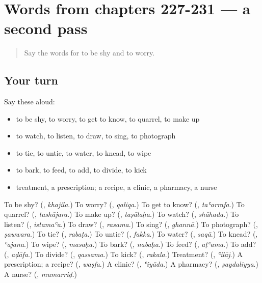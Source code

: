 \section[(dialogue)]{Words from chapters 227-231 — a second pass}

\label{lesson:AR-R231-second-pass-words-from-chapters-227-231}



\begin{quote}
Say the words for to be shy and to worry.
\end{quote}

\subsection*{Your turn}
Say these aloud:

\begin{itemize}
\raggedright
  \item to be shy, to worry, to get to know, to quarrel, to make up
  \item to watch, to listen, to draw, to sing, to photograph
  \item to tie, to untie, to water, to knead, to wipe
  \item to bark, to feed, to add, to divide, to kick
  \item treatment, a prescription; a recipe, a clinic, a pharmacy, a nurse
\end{itemize}

\begin{tcolorbox}[breakable,colback=teal!4,colframe=teal!35!black,title={Before you move on}]
To be shy? (\textbf{}, \emph{khajila}.) To worry? (\textbf{}, \emph{qaliqa}.) To get to know? (\textbf{}, \emph{taʿarrafa}.) To quarrel? (\textbf{}, \emph{tashājara}.) To make up? (\textbf{}, \emph{taṣālaḥa}.) To watch? (\textbf{}, \emph{shāhada}.) To listen? (\textbf{}, \emph{istamaʿa}.) To draw? (\textbf{}, \emph{rasama}.) To sing? (\textbf{}, \emph{ghannā}.) To photograph? (\textbf{}, \emph{ṣawwara}.) To tie? (\textbf{}, \emph{rabaṭa}.) To untie? (\textbf{}, \emph{fakka}.) To water? (\textbf{}, \emph{saqā}.) To knead? (\textbf{}, \emph{ʿajana}.) To wipe? (\textbf{}, \emph{masaḥa}.) To bark? (\textbf{}, \emph{nabaḥa}.) To feed? (\textbf{}, \emph{aṭʿama}.) To add? (\textbf{}, \emph{aḍāfa}.) To divide? (\textbf{}, \emph{qassama}.) To kick? (\textbf{}, \emph{rakala}.) Treatment? (\textbf{}, \emph{ʿilāj}.) A prescription; a recipe? (\textbf{}, \emph{waṣfa}.) A clinic? (\textbf{}, \emph{ʿiyāda}.) A pharmacy? (\textbf{}, \emph{ṣaydaliyya}.) A nurse? (\textbf{}, \emph{mumarriḍ}.)
\end{tcolorbox}
